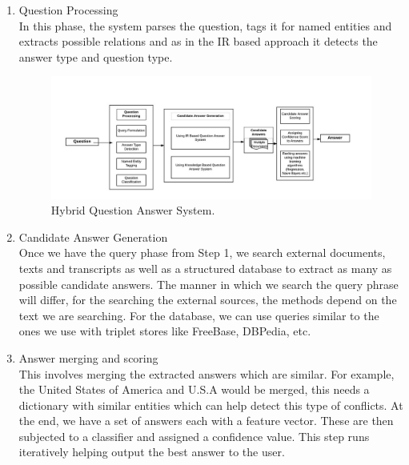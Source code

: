 \begin{enumerate}

\item Question Processing \\
In this phase, the system parses the question, tags it for named entities and extracts possible relations and as in the IR based approach it detects the answer type and question type.

\begin{figure}[htb]
\centering
\includegraphics[scale=0.8]{images/Hybrid_QA.jpg}
\caption{Hybrid Question Answer System.} 
\label{fig:Hybrid_QA}
\end{figure}

\break
\item Candidate Answer Generation \\
Once we have the query phase from Step 1, we search external documents, texts and transcripts as well as a structured database to extract as many as possible candidate answers. The manner in which we search the query phrase will differ, for the searching the external sources, the methods depend on the text we are searching. For the database, we can use queries similar to the ones we use with triplet stores like FreeBase, DBPedia, etc.

\item Answer merging and scoring \\
This involves merging the extracted answers which are similar. For example, the United States of America and U.S.A would be merged, this needs a dictionary with similar entities which can help detect this type of conflicts. At the end, we have a set of answers each with a feature vector. These are then subjected to a classifier and assigned a confidence value. This step runs iteratively helping output the best answer to the user.

 \end{enumerate}
 
